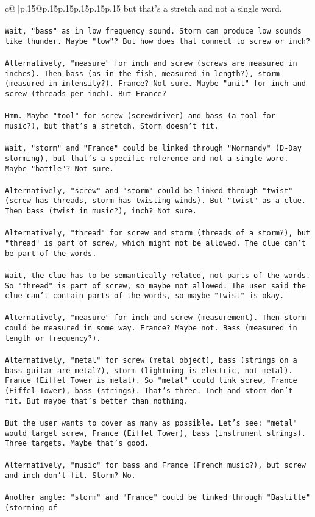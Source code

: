 \documentclass{article}
\begin{document}
{\begin{supertabular}{c@{$\;$}|p{.15\linewidth}@{}p{.15\linewidth}p{.15\linewidth}p{.15\linewidth}p{.15\linewidth}p{.15\linewidth}}
{{{but that's a stretch and not a single word.\\ \tt \\ \tt Wait, "bass" as in low frequency sound. Storm can produce low sounds like thunder. Maybe "low"? But how does that connect to screw or inch?\\ \tt \\ \tt Alternatively, "measure" for inch and screw (screws are measured in inches). Then bass (as in the fish, measured in length?), storm (measured in intensity?). France? Not sure. Maybe "unit" for inch and screw (threads per inch). But France?\\ \tt \\ \tt Hmm. Maybe "tool" for screw (screwdriver) and bass (a tool for music?), but that's a stretch. Storm doesn't fit.\\ \tt \\ \tt Wait, "storm" and "France" could be linked through "Normandy" (D-Day storming), but that's a specific reference and not a single word. Maybe "battle"? Not sure.\\ \tt \\ \tt Alternatively, "screw" and "storm" could be linked through "twist" (screw has threads, storm has twisting winds). But "twist" as a clue. Then bass (twist in music?), inch? Not sure.\\ \tt \\ \tt Alternatively, "thread" for screw and storm (threads of a storm?), but "thread" is part of screw, which might not be allowed. The clue can't be part of the words.\\ \tt \\ \tt Wait, the clue has to be semantically related, not parts of the words. So "thread" is part of screw, so maybe not allowed. The user said the clue can't contain parts of the words, so maybe "twist" is okay.\\ \tt \\ \tt Alternatively, "measure" for inch and screw (measurement). Then storm could be measured in some way. France? Maybe not. Bass (measured in length or frequency?).\\ \tt \\ \tt Alternatively, "metal" for screw (metal object), bass (strings on a bass guitar are metal?), storm (lightning is electric, not metal). France (Eiffel Tower is metal). So "metal" could link screw, France (Eiffel Tower), bass (strings). That's three. Inch and storm don't fit. But maybe that's better than nothing.\\ \tt \\ \tt But the user wants to cover as many as possible. Let's see: "metal" would target screw, France (Eiffel Tower), bass (instrument strings). Three targets. Maybe that's good.\\ \tt \\ \tt Alternatively, "music" for bass and France (French music?), but screw and inch don't fit. Storm? No.\\ \tt \\ \tt Another angle: "storm" and "France" could be linked through "Bastille" (storming of }}}
\end{supertabular}}
\end{document}
